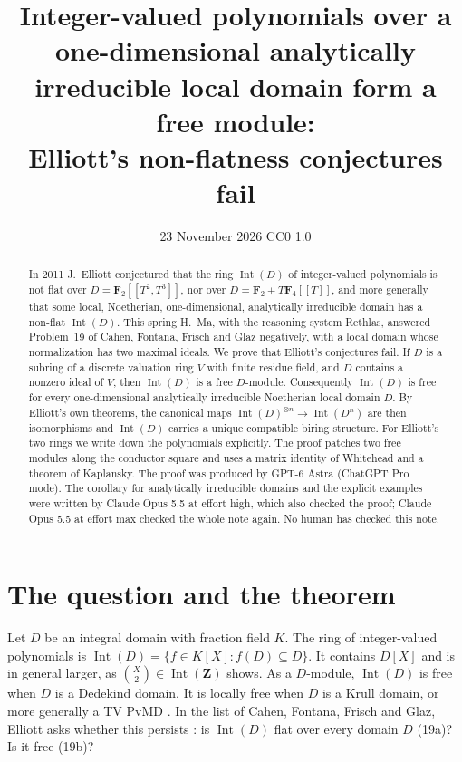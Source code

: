 \documentclass[11pt,a4paper]{article}
\title{Integer-valued polynomials over a one-dimensional analytically\\ irreducible local domain form a free module:\\ Elliott's non-flatness conjectures fail}
\author{}
\date{23 November 2026 \quad CC0 1.0}
\theoremstyle{plain}
\theoremstyle{remark}
\newcommand{\F}{\mathbf F}
\newcommand{\Int}{\operatorname{Int}}
\begin{document}
\maketitle

\begin{abstract}
\noindent
In 2011 J.~Elliott conjectured that the ring $\Int(D)$ of integer-valued polynomials is not flat over
$D=\F_2[[T^2,T^3]]$, nor over $D=\F_2+T\F_4[[T]]$, and more generally that some local, Noetherian,
one-dimensional, analytically irreducible domain has a non-flat $\Int(D)$. This spring H.~Ma, with the reasoning
system Rethlas, answered Problem~19 of Cahen, Fontana, Frisch and Glaz negatively, with a local domain whose
normalization has two maximal ideals. We prove that Elliott's conjectures fail. If $D$ is a subring of a
discrete valuation ring $V$ with finite residue field, and $D$ contains a nonzero ideal of $V$, then $\Int(D)$ is a
free $D$-module. Consequently $\Int(D)$ is free for every one-dimensional analytically irreducible Noetherian local
domain $D$. By Elliott's own theorems, the canonical maps $\Int(D)^{\otimes n}\to\Int(D^n)$ are then isomorphisms and
$\Int(D)$ carries a unique compatible biring structure. For Elliott's two rings we write down the polynomials
explicitly. The proof patches two free modules along the conductor square and uses a matrix identity of
Whitehead and a theorem of Kaplansky. The proof was produced by GPT-6 Astra (ChatGPT Pro mode). The corollary
for analytically irreducible domains and the explicit examples were written by Claude Opus 5.5 at effort high,
which also checked the proof; Claude Opus 5.5 at effort max checked the whole note again. No human has checked
this note.
\end{abstract}

\section{The question and the theorem}

Let $D$ be an integral domain with fraction field $K$. The ring of integer-valued polynomials is
$\Int(D)=\{f\in K[X]: f(D)\subseteq D\}$. It contains $D[X]$ and is in general larger, as $\binom{X}{2}\in\Int(\mathbf Z)$ shows. As a $D$-module, $\Int(D)$ is free when $D$ is
a Dedekind domain. It is locally free when $D$ is a Krull domain, or more generally a TV PvMD
\cite[Theorem~1.2]{E11a}. In the list of Cahen, Fontana, Frisch and Glaz, Elliott asks whether this persists
\cite[Problem~19, p.~9]{CFFG}: is $\Int(D)$ flat over every domain $D$ (19a)? Is it free (19b)?
\end{document}
